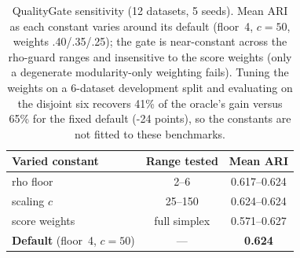 \begin{table}[htbp]
\centering
\caption{QualityGate sensitivity (12 datasets, 5 seeds). Mean ARI as each constant varies around its default (floor~4, $c{=}50$, weights .40/.35/.25); the gate is near-constant across the rho-guard ranges and insensitive to the score weights (only a degenerate modularity-only weighting fails). Tuning the weights on a 6-dataset development split and evaluating on the disjoint six recovers 41\% of the oracle's gain versus 65\% for the fixed default (-24 points), so the constants are not fitted to these benchmarks.}
\label{tab:sensitivity}
\footnotesize
\begin{tabular}{lcc}
\toprule
Varied constant & Range tested & Mean ARI \\
\midrule
rho floor & 2--6 & 0.617--0.624 \\
scaling $c$ & 25--150 & 0.624--0.624 \\
score weights & full simplex & 0.571--0.627 \\
\midrule
\textbf{Default} (floor~4, $c{=}50$) & --- & \textbf{0.624} \\
\bottomrule
\end{tabular}
\end{table}
